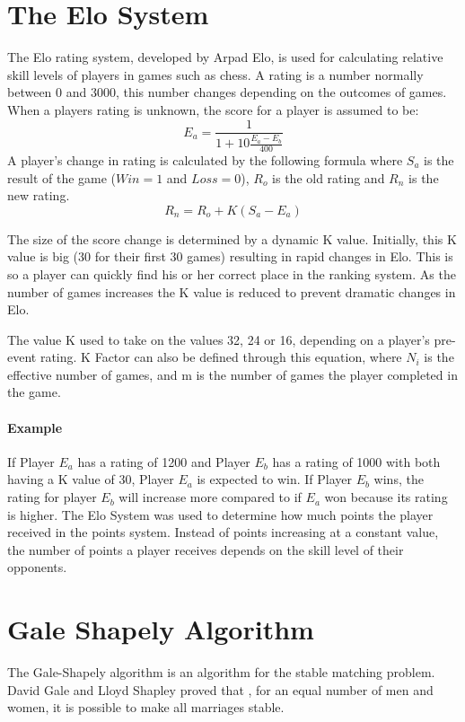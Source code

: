 \section{The Elo System}
\label{elosystem}
The Elo rating system, developed by Arpad Elo, is used for calculating relative skill levels of players in games such as chess.\cite{glickman1999rating} A rating is a number normally between 0 and 3000, this number changes depending on the outcomes of games. When a players rating is unknown, the score for a player is assumed to be:
\[ E_a = \frac{1}{1+10\frac{E_a-E_b}{400}} \] \cite{pelanek2014application} A player's change in rating is calculated by the following formula where ${S_a}$ is the result of the game (${Win = 1}$ and $Loss = 0$), $R_o$ is the old rating and $R_n$ is the new rating.
\[ R_n = R_o + K(S_a - E_a) \]


{\raggedright The size of the score change is determined by a dynamic K value. Initially, this K value is big (30 for their first 30 games) resulting in rapid changes in Elo. This is so a player can quickly find his or her correct place in the ranking system. As the number of games increases the K value is reduced to prevent dramatic changes in Elo.}\newline
\cite{glickmanrating} The value K used to take on the values 32, 24 or 16, depending on a player’s pre-event rating. K Factor can also be defined through this equation, where $N_i$ is the effective number of games, and m is the number of games the player completed in the game.
\paragraph{Example} If Player $E_a$ has a rating of 1200 and Player $E_b$ has a rating of 1000 with both having a K value of 30, Player $E_a$ is expected to win. If Player $E_b$ wins, the rating for player $E_b$ will increase more compared to if $E_a$ won because its rating is higher.\hfill \break
The Elo System was used to determine how much points the player received in the points system. Instead of points increasing at a constant value, the number of points a player receives depends on the skill level of their opponents.


\section{Gale Shapely Algorithm}
The Gale-Shapely algorithm \cite{dubins1981machiavelli} is an algorithm for the stable matching problem. \cite{gale1985some}
David Gale and Lloyd Shapley proved that \cite{gale1962college}, for an equal number of men and women, it is possible to make all marriages stable. 

